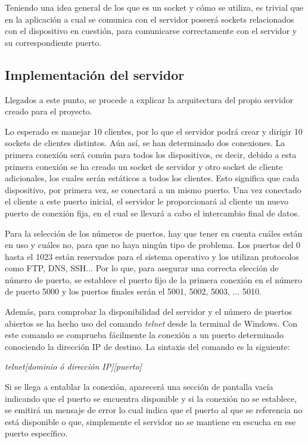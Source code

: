 \documentclass[a4paper,11pt]{book}
\begin{document}
				 Teniendo una idea general de los que es un socket y cómo se utiliza, es trivial que en la aplicación a cual se comunica con el servidor poseerá sockets relacionados con el dispositivo en cuestión, para comunicarse correctamente con el servidor y su correspondiente puerto.
				 
				 \subsection{Implementación del servidor}
				 Llegados a este punto, se procede a explicar la arquitectura del propio servidor creado para el proyecto.
				 
				 Lo esperado es manejar 10 clientes, por lo que el servidor podrá crear y dirigir 10 sockets de clientes distintos. Aún así, se han determinado dos conexiones. La primera conexión será común para todos los dispositivos, es decir, debido a esta primera conexión se ha creado un socket de servidor y otro socket de cliente adicionales, los cuales serán estáticos a todos los clientes. Esto significa que cada dispositivo, por primera vez, se conectará a un mismo puerto. Una vez conectado el cliente a este puerto inicial, el servidor le proporcionará al cliente un nuevo puerto de conexión fija, en el cual se llevará a cabo el intercambio final de datos.
				 
				 Para la selección de los números de puertos, hay que tener en cuenta cuáles están en uso y cuáles no, para que no haya ningún tipo de problema. Los puertos del 0 hasta el 1023 están reservados para el sistema operativo y los utilizan protocolos como FTP, DNS, SSH... Por lo que, para asegurar una correcta elección de número de puerto, se establece el puerto fijo de la primera conexión en el número de puerto 5000 y los puertos finales serán el 5001, 5002, 5003, ... 5010. 
				 
				 Además, para comprobar la disponibilidad del servidor y el número de puertos abiertos se ha hecho uso del comando \textit{telnet} desde la terminal de Windows. Con este comando se comprueba fácilmente la conexión a un puerto determinado conociendo la dirección IP de destino. La sintaxis del comando es la siguiente:
				 \begin{center}
				 \textit{telnet[dominio ó dirección IP][puerto]}
				 \end{center}
				 Si se llega a entablar la conexión, aparecerá una sección de pantalla vacía indicando que el puerto se encuentra disponible y si la conexión no se establece, se emitirá un mensaje de error lo cual indica que el puerto al que se referencia no está disponible o que, simplemente el servidor no se mantiene en escucha en ese puerto específico.
				 
\end{document}
